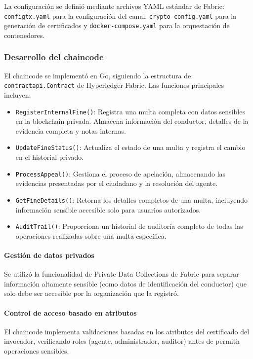 La configuración se definió mediante archivos YAML estándar de Fabric: \texttt{configtx.yaml} para la configuración del canal, \texttt{crypto-config.yaml} para la generación de certificados y \texttt{docker-compose.yaml} para la orquestación de contenedores.

\subsubsection{Desarrollo del chaincode}

El chaincode se implementó en Go, siguiendo la estructura de \texttt{contractapi.Contract} de Hyperledger Fabric. Las funciones principales incluyen:

\begin{itemize}
    \item \texttt{RegisterInternalFine()}: Registra una multa completa con datos sensibles en la blockchain privada. Almacena información del conductor, detalles de la evidencia completa y notas internas.
    
    \item \texttt{UpdateFineStatus()}: Actualiza el estado de una multa y registra el cambio en el historial privado.
    
    \item \texttt{ProcessAppeal()}: Gestiona el proceso de apelación, almacenando las evidencias presentadas por el ciudadano y la resolución del agente.
    
    \item \texttt{GetFineDetails()}: Retorna los detalles completos de una multa, incluyendo información sensible accesible solo para usuarios autorizados.
    
    \item \texttt{AuditTrail()}: Proporciona un historial de auditoría completo de todas las operaciones realizadas sobre una multa específica.
\end{itemize}

\paragraph{Gestión de datos privados}
Se utilizó la funcionalidad de Private Data Collections de Fabric para separar información altamente sensible (como datos de identificación del conductor) que solo debe ser accesible por la organización que la registró.

\paragraph{Control de acceso basado en atributos}
El chaincode implementa validaciones basadas en los atributos del certificado del invocador, verificando roles (agente, administrador, auditor) antes de permitir operaciones sensibles.

